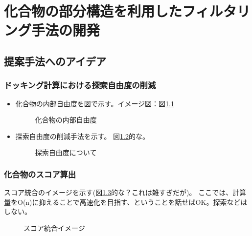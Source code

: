 \chapter{化合物の部分構造を利用したフィルタリング手法の開発}


\section{提案手法へのアイデア}
\subsection{ドッキング計算における探索自由度の削減}

\begin{itemize}
\item 化合物の内部自由度を図で示す。イメージ図：図\ref{fig:compound_freedom}
\begin{figure}[htb]
 \begin{center}
  \caption{化合物の内部自由度}
  \label{fig:compound_freedom}
 \end{center}
\end{figure}

\item 探索自由度の削減手法を示す。 図\ref{fig:docking_freedom}的な。
\begin{figure}[htb]
 \begin{center}
  \caption{探索自由度について}
  \label{fig:docking_freedom}
 \end{center}
\end{figure}

\end{itemize}

\subsection{化合物のスコア算出}
スコア統合のイメージを示す(図\ref{fig:integration_image}的な？これは雑すぎだが)。
ここでは、計算量をO(n)に抑えることで高速化を目指す、ということを話せばOK。探索などはしない。

\begin{figure}[htb]
 \begin{center}
  \caption{スコア統合イメージ}
  \label{fig:integration_image}
 \end{center}
\end{figure}

